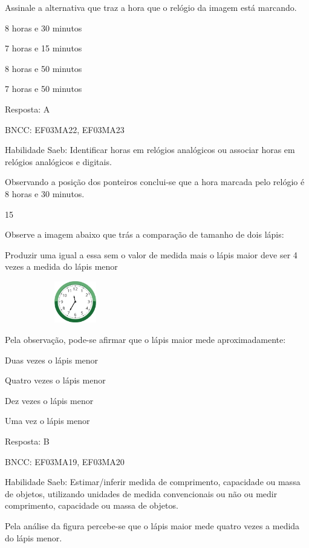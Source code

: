 \begin{escolha}
\begin{escolha}
Assinale a alternativa que traz a hora que o relógio da imagem está
marcando.

\begin{escolha}
\item
  8 horas e 30 minutos
\item
  7 horas e 15 minutos
\item
  8 horas e 50 minutos
\item
  7 horas e 50 minutos
\end{escolha}

Resposta: A

BNCC: EF03MA22, EF03MA23

Habilidade Saeb: Identificar horas em relógios analógicos ou associar
horas em relógios analógicos e digitais.

Observando a posição dos ponteiros conclui-se que a hora marcada pelo
relógio é 8 horas e 30 minutos.

\num{15}

Observe a imagem abaixo que trás a comparação de tamanho de dois lápis:

Produzir uma igual a essa sem o valor de medida mais o lápis maior deve
ser 4 vezes a medida do lápis menor

\includegraphics[width=2.43137in,height=0.71356in]{media/image116.png}

Pela observação, pode-se afirmar que o lápis maior mede aproximadamente:

\begin{escolha}
\item
  Duas vezes o lápis menor
\item
  Quatro vezes o lápis menor
\item
  Dez vezes o lápis menor
\item
  Uma vez o lápis menor
\end{escolha}

Resposta: B

BNCC: EF03MA19, EF03MA20

Habilidade Saeb: Estimar/inferir medida de comprimento, capacidade ou
massa de objetos, utilizando unidades de medida convencionais ou não ou
medir comprimento, capacidade ou massa de objetos.

Pela análise da figura percebe-se que o lápis maior mede quatro vezes a
medida do lápis menor.


\end{escolha}
\end{escolha}
